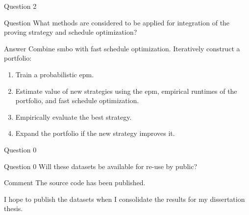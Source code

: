\begin{frame}{Question 2}
\begin{block}{Question}
What methods are considered to be applied for integration of the proving strategy and schedule optimization?
\end{block}
\begin{exampleblock}{Answer}
Combine \gls{smbo} with fast schedule optimization. Iteratively construct a portfolio:
\begin{enumerate}
\item Train a probabilistic \gls{epm}.
\item Estimate value of new strategies using the \gls{epm},
empirical runtimes of the portfolio, and
fast schedule optimization.
\item Empirically evaluate the best strategy.
\item Expand the portfolio if the new strategy improves it.
\end{enumerate}
\end{exampleblock}
\end{frame}
\begin{frame}{Question 0}
\begin{block}{Question 0}
Will these datasets be available for re-use by public?
\end{block}
\begin{exampleblock}{Comment}
The source code has been published.

I hope to publish the datasets when I consolidate the results for my dissertation thesis.
\end{exampleblock}
\end{frame}
